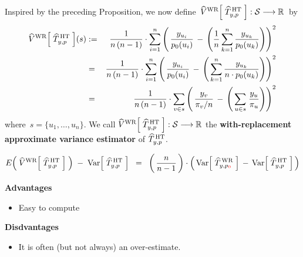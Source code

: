 \vskip 0.5cm
\noindent
Inspired by the preceding Proposition, we now define
\,$\widehat{V}^{\textnormal{WR}}\!\left[\;\widehat{T}^{\,\textnormal{HT}}_{y,p}\;\right]
: \mathcal{S} \longrightarrow \Re$\,
by
\begin{eqnarray*}
\widehat{V}^{\textnormal{WR}}\!\left[\;\widehat{T}^{\,\textnormal{HT}}_{y,p}\;\right]\!(s)
& := &
	\dfrac{1}{n\,(n-1)}\cdot\overset{n}{\underset{i = 1}{\sum}}\left(\,
		\dfrac{y_{u_{i}}}{p_{0}(u_{i})}
		\, - \,
		\left(\dfrac{1}{n}\,\overset{n}{\underset{k=1}{\sum}}\,\dfrac{y_{u_{k}}}{p_{0}(u_{k})}\right)
		\right)^{2}
\\
& = &
	\dfrac{1}{n\,(n-1)}\cdot\overset{n}{\underset{i = 1}{\sum}}\left(\,
		\dfrac{y_{u_{i}}}{p_{0}(u_{i})}
		\, - \,
		\left(\,\overset{n}{\underset{k=1}{\sum}}\,\dfrac{y_{u_{k}}}{n \cdot p_{0}(u_{k})}\right)
		\right)^{2}
\\
& = &
	\dfrac{1}{n\,(n-1)}\cdot \underset{v \in s}{\sum} \left(\,
		\dfrac{y_{v}}{\pi_{v}/n}
		\, - \,
		\left(\,\underset{u \in s}{\sum}\;\dfrac{y_{u}}{\pi_{u}}\right)
		\right)^{2}
\end{eqnarray*}
where \,$s = \{u_{1},\ldots,u_{n}\}$.
We call
\;$\widehat{V}^{\textnormal{WR}}\!\left[\;\widehat{T}^{\,\textnormal{HT}}_{y,p}\;\right]
: \mathcal{S} \longrightarrow \Re$\;
the \textbf{with-replacement approximate variance estimator}
of \;$\widehat{T}^{\,\textnormal{HT}}_{y,p}$.

\vskip 0.5cm
\begin{proposition}
\begin{equation*}
E\!\left(\;\widehat{V}^{\textnormal{WR}}\!\left[\;\widehat{T}^{\,\textnormal{HT}}_{y,p}\;\right]\;\right)
\; - \; \Var\!\left[\;\widehat{T}^{\,\textnormal{HT}}_{y,p}\;\right]
\;\; = \;\;
	\left(\,\dfrac{n}{n-1}\,\right)
	\cdot
	\left(\,
		\Var\!\left[\;\widehat{T}^{\,\textnormal{WR}}_{y,p_{\color{red}0}}\;\right]
		\, - \,
		\Var\!\left[\;\widehat{T}^{\,\textnormal{HT}}_{y,p}\;\right]
		\,\right)
\end{equation*}
\end{proposition}


\vskip 0.5cm
\noindent
\textbf{Advantages}
\begin{itemize}
\item
	Easy to compute
\end{itemize}

\vskip 0.5cm
\noindent
\textbf{Disdvantages}
\begin{itemize}
\item
	It is often (but not always) an over-estimate.
\end{itemize}

